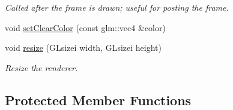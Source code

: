\begin{DoxyCompactItemize}
\begin{DoxyCompactList}\small\item\em Called after the frame is drawn; useful for posting the frame. \end{DoxyCompactList}\item 
void \hyperlink{class_renderer_a8dd7e25ac4d1930cfa6a4533ed80557d}{set\+Clear\+Color} (const glm\+::vec4 \&color)
\item 
void \hyperlink{class_renderer_a8c77522a011a90dfc30929b8d9d3cf1e}{resize} (G\+Lsizei width, G\+Lsizei height)
\begin{DoxyCompactList}\small\item\em Resize the renderer. \end{DoxyCompactList}\end{DoxyCompactItemize}
\subsection*{Protected Member Functions}
